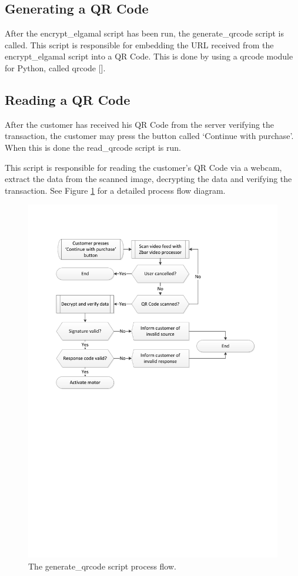 \subsection{Generating a QR Code}
\label{sec:gen-qrcode}

After the encrypt\_elgamal script has been run, the generate\_qrcode script is
called. This script is responsible for embedding the URL received from the
encrypt\_elgamal script into a QR Code. This is done by using a qrcode module
for Python, called qrcode [\cite{website:qrcode-generator}].

\subsection{Reading a QR Code}

After the customer has received his QR Code from the server verifying the
transaction, the customer may press the button called `Continue with purchase'.
When this is done the read\_qrcode script is run.

This script is responsible for reading the customer's QR Code via a webcam,
extract the data from the scanned image, decrypting the data and verifying the
transaction. See Figure \ref{fig:read-qrcode-processflow} for a detailed process
flow diagram.

\begin{figure}
 \centering 
 \includegraphics[clip=true, trim = 0 390 50 70, scale=0.75]{read_qrcode_processflow}
 \caption{The generate\_qrcode script process flow.}
 \label{fig:read-qrcode-processflow}
\end{figure}

